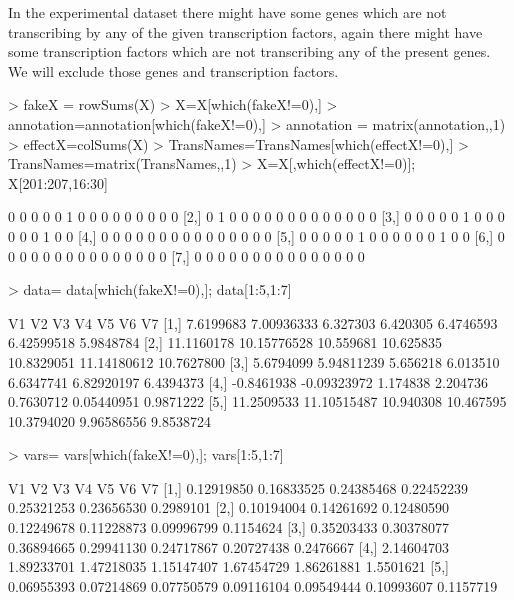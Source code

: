 \documentclass{article}
\begin{document}
In the experimental dataset there might have some genes which are not transcribing by any of the given transcription factors, again there might have some transcription factors which are not transcribing any of the present genes. We will exclude those genes and transcription factors.
\begin{Schunk}
\begin{Sinput}
> fakeX = rowSums(X)
> X=X[which(fakeX!=0),]
> annotation=annotation[which(fakeX!=0),]
> annotation = matrix(annotation,,1)
> effectX=colSums(X)
> TransNames=TransNames[which(effectX!=0),]
> TransNames=matrix(TransNames,,1)
> X=X[,which(effectX!=0)]; X[201:207,16:30]
\end{Sinput}
\begin{Soutput}
     [,1] [,2] [,3] [,4] [,5] [,6] [,7] [,8] [,9] [,10] [,11] [,12] [,13] [,14] [,15]
[1,]    0    0    0    0    0    1    0    0    0     0     0     0     0     0     0
[2,]    0    1    0    0    0    0    0    0    0     0     0     0     0     0     0
[3,]    0    0    0    0    0    1    0    0    0     0     0     0     1     0     0
[4,]    0    0    0    0    0    0    0    0    0     0     0     0     0     0     0
[5,]    0    0    0    0    0    1    0    0    0     0     0     0     1     0     0
[6,]    0    0    0    0    0    0    0    0    0     0     0     0     0     0     0
[7,]    0    0    0    0    0    0    0    0    0     0     0     0     0     0     0
\end{Soutput}
\begin{Sinput}
> data= data[which(fakeX!=0),]; data[1:5,1:7]
\end{Sinput}
\begin{Soutput}
             V1          V2        V3        V4         V5          V6         V7
[1,]  7.6199683  7.00936333  6.327303  6.420305  6.4746593  6.42599518  5.9848784
[2,] 11.1160178 10.15776528 10.559681 10.625835 10.8329051 11.14180612 10.7627800
[3,]  5.6794099  5.94811239  5.656218  6.013510  6.6347741  6.82920197  6.4394373
[4,] -0.8461938 -0.09323972  1.174838  2.204736  0.7630712  0.05440951  0.9871222
[5,] 11.2509533 11.10515487 10.940308 10.467595 10.3794020  9.96586556  9.8538724
\end{Soutput}
\begin{Sinput}
> vars= vars[which(fakeX!=0),]; vars[1:5,1:7]
\end{Sinput}
\begin{Soutput}
             V1         V2         V3         V4         V5         V6        V7
[1,] 0.12919850 0.16833525 0.24385468 0.22452239 0.25321253 0.23656530 0.2989101
[2,] 0.10194004 0.14261692 0.12480590 0.12249678 0.11228873 0.09996799 0.1154624
[3,] 0.35203433 0.30378077 0.36894665 0.29941130 0.24717867 0.20727438 0.2476667
[4,] 2.14604703 1.89233701 1.47218035 1.15147407 1.67454729 1.86261881 1.5501621
[5,] 0.06955393 0.07214869 0.07750579 0.09116104 0.09549444 0.10993607 0.1157719
\end{Soutput}
\end{Schunk}
\end{document}
